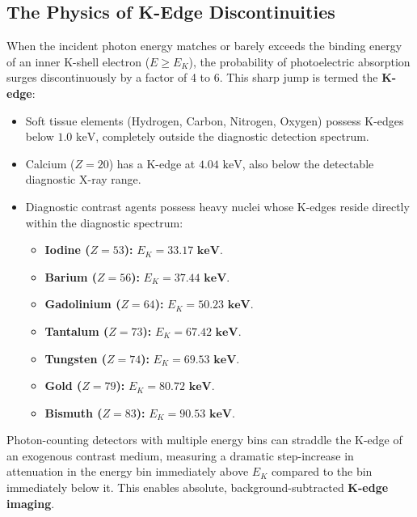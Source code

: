 \documentclass[11pt,a4paper]{article}
\begin{document}
\subsection{The Physics of K-Edge Discontinuities}
When the incident photon energy matches or barely exceeds the binding energy of an inner K-shell electron ($E \ge E_K$), the probability of photoelectric absorption surges discontinuously by a factor of 4 to 6. This sharp jump is termed the \textbf{K-edge}:
\begin{itemize}[leftmargin=2em]
    \item Soft tissue elements (Hydrogen, Carbon, Nitrogen, Oxygen) possess K-edges below $1.0\text{ keV}$, completely outside the diagnostic detection spectrum.
    \item Calcium ($Z = 20$) has a K-edge at $4.04\text{ keV}$, also below the detectable diagnostic X-ray range.
    \item Diagnostic contrast agents possess heavy nuclei whose K-edges reside directly within the diagnostic spectrum:
    \begin{itemize}
        \item \textbf{Iodine ($Z = 53$):} $E_K = \mathbf{33.17\text{ keV}}$.
        \item \textbf{Barium ($Z = 56$):} $E_K = \mathbf{37.44\text{ keV}}$.
        \item \textbf{Gadolinium ($Z = 64$):} $E_K = \mathbf{50.23\text{ keV}}$.
        \item \textbf{Tantalum ($Z = 73$):} $E_K = \mathbf{67.42\text{ keV}}$.
        \item \textbf{Tungsten ($Z = 74$):} $E_K = \mathbf{69.53\text{ keV}}$.
        \item \textbf{Gold ($Z = 79$):} $E_K = \mathbf{80.72\text{ keV}}$.
        \item \textbf{Bismuth ($Z = 83$):} $E_K = \mathbf{90.53\text{ keV}}$.
    \end{itemize}
\end{itemize}

Photon-counting detectors with multiple energy bins can straddle the K-edge of an exogenous contrast medium, measuring a dramatic step-increase in attenuation in the energy bin immediately above $E_K$ compared to the bin immediately below it. This enables absolute, background-subtracted \textbf{K-edge imaging}.
\end{document}
